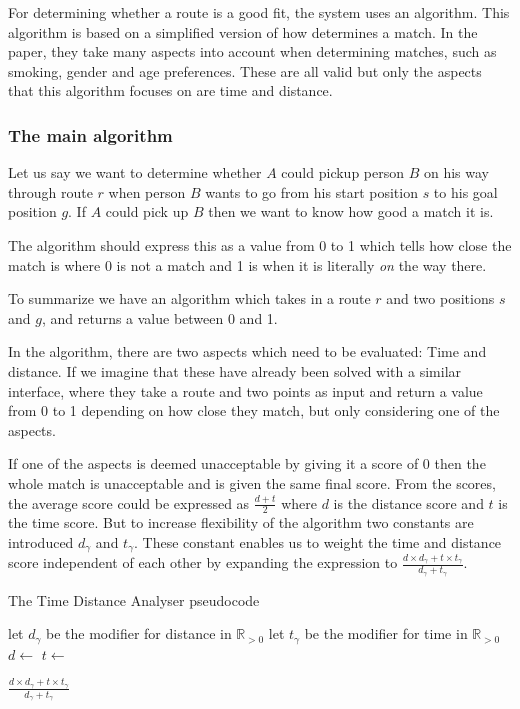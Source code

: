 For determining whether a route is a good fit, the system uses an algorithm.
This algorithm is based on a simplified version of how \citet{ghoseiri2011real} determines a match.
In the paper, they take many aspects into account when determining matches, such as smoking, gender and age preferences.
These are all valid but only the aspects that this algorithm focuses on are time and distance.

\subsubsection{The main algorithm}
Let us say we want to determine whether $A$ could pickup person $B$ on his way through route $r$ when person $B$ wants to go from his start position $s$ to his goal position $g$.
If $A$ could pick up $B$ then we want to know how good a match it is.

The algorithm should express this as a value from 0 to 1 which tells how close the match is where 0 is not a match and 1 is when it is literally \emph{on} the way there.

To summarize we have an algorithm  which takes in a route $r$ and two positions $s$ and $g$, and returns a value between 0 and 1.

In the algorithm, there are two aspects which need to be evaluated: Time and distance.
If we imagine that these have already been solved with a similar interface, where they take a route and two points as input and return a value from 0 to 1 depending on how close they match, but only considering one of the aspects.

If one of the aspects is deemed unacceptable by giving it a score of 0 then the whole match is unacceptable and is given the same final score.
From the scores, the average score could be expressed as $\frac{d+t}{2}$ where $d$ is the distance score and $t$ is the time score.
But to increase flexibility of the algorithm two constants are introduced $d_\gamma$ and $t_\gamma$.
These constant enables us to weight the time and distance score independent of each other by expanding the expression to $\frac{d\times d_\gamma+t\times t_\gamma}{d_\gamma+t_\gamma}$.

\begin{algorithm}
	\caption{The Time Distance Analyser pseudocode}
	\label{alg:timedistanalyser}
	\begin{algorithmic}[1]
		\Require 
		\Statex let $d_\gamma$ be the modifier for distance in $\mathbb{R}_{>0}$
		\Statex let $t_\gamma$ be the modifier for time in $\mathbb{R}_{>0}$
		\Statex 
			\State $d\gets$
			\State $t\gets$
			
				\State \Return $\frac{d\times d_\gamma+t\times t_\gamma}{d_\gamma+t_\gamma}$
			\Else
				\State{}
			\EndIf
		\EndFunction
	\end{algorithmic}
\end{algorithm}

